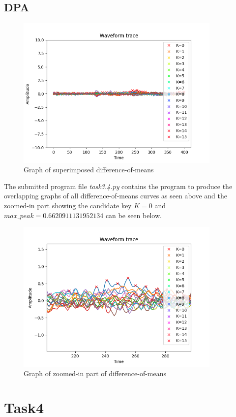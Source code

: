 \documentclass[1p,16pt]{elsarticle}
\begin{document}
\subsection{DPA}%
\label{sub:dpa}

\begin{figure}[H]
	\centering
    \centerline{\includegraphics[width=10cm]{peaks_plot}}
    \caption{Graph of superimposed difference-of-means}\label{fig:peaks_plot}
\end{figure}

The submitted program file \textit{task3.4.py} contains the program to produce the overlapping graphs
of all difference-of-means curves as seen above and the zoomed-in part
showing the candidate key $K=0$ and $max\_peak=0.6620911131952134$ can be seen below.

\begin{figure}[H]
	\centering
    \centerline{\includegraphics[width=10cm]{peak_plot}}
    \caption{Graph of zoomed-in part of difference-of-means}\label{fig:peak_plot}
\end{figure}

\section{Task4}
\end{document}
